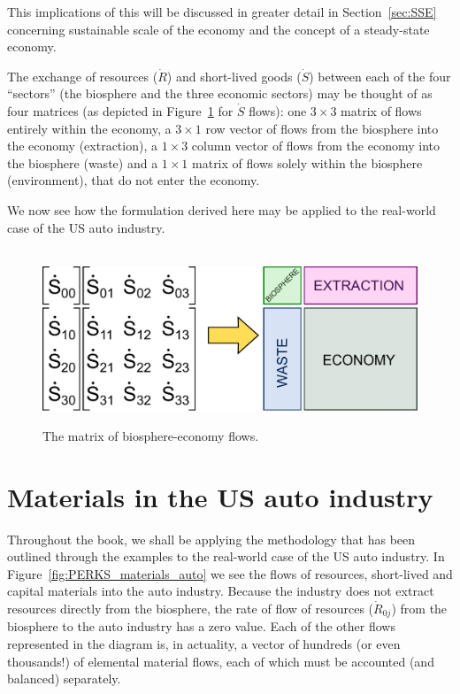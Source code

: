 \noindent{}This implications of this 
will be discussed in greater detail
in Section~\ref{sec:SSE} concerning 
sustainable scale of the economy and
the concept of a steady-state economy.

The exchange of resources ($\dot{R}$) and 
short-lived goods ($\dot{S}$) between 
each of the four ``sectors''
(the biosphere and 
the three economic sectors) 
may be thought of as four matrices 
(as depicted in Figure~\ref{fig:C_mat_matrix} 
for $\dot{S}$ flows): 
one $3\times3$ matrix of flows 
entirely within the economy, 
a $3\times1$ row vector of flows from the 
biosphere into the economy (extraction), 
a $1\times3$ column vector of flows from the economy 
into the biosphere (waste) 
and a $1\times1$ matrix of flows 
solely within the biosphere (environment), 
that do not enter the economy.

We now see how the formulation derived here may be
applied to the real-world case of the US auto industry.

\begin{figure}[!ht]
\centering\
\includegraphics[width=0.8\linewidth]{Part_1/Chapter_Materials/images/Matrix.pdf}
\caption[The matrix of biosphere\index{biosphere}-economy flows]{The matrix of biosphere-economy flows.}
\label{fig:C_mat_matrix}
\end{figure}

\section{Materials in the US auto industry}
\label{sec:materials_auto}

Throughout the book, we shall be applying the methodology
that has been outlined through the examples to the
real-world case of the US auto industry.
In Figure~\ref{fig:PERKS_materials_auto}
we see the flows of resources,
short-lived and capital materials
into the auto industry.
Because the industry does not
extract resources directly from the biosphere,
the rate of flow of resources ($\dot{R}_{0j}$) 
from the biosphere to the auto industry 
has a zero value.
Each of the other flows represented in the diagram is,
in actuality,
a vector of hundreds (or even thousands!)
of elemental material flows,
each of which must be accounted 
(and balanced) separately.

